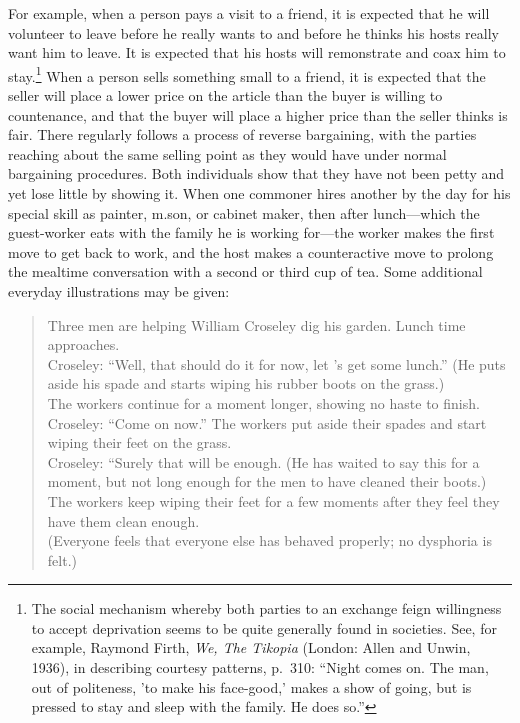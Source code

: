 \documentclass[openany,nobib]{tufte-book}
\begin{document}
\newpage For example, when a person pays a visit to a friend, it is expected that
he will volunteer to leave before he really wants to and before he
thinks his hosts really want him to leave. It is expected that his hosts
will remonstrate and coax him to stay.\footnote{The social mechanism
  whereby both parties to an exchange feign willingness to accept
  deprivation seems to be quite generally found in societies. See, for
  example, Raymond Firth, \emph{We, The Tikopia} (London: Allen and
  Unwin, 1936), in describing courtesy patterns, p.~310: ``Night comes
  on. The man, out of politeness, 'to make his face-good,' makes a show
  of going, but is pressed to stay and sleep with the family. He does
  so.''} When a person sells something small to a friend, it is expected
that the seller will place a lower price on the article than the buyer
is willing to countenance, and that the buyer will place a higher price
than the seller thinks is fair. There regularly follows a process of
reverse bargaining, with the parties reaching about the same selling
point as they would have under normal bargaining procedures. Both
individuals show that they have not been petty and yet lose little by
showing it. When one commoner hires another by the day for his special
skill as painter, m.son, or cabinet maker, then after lunch---which the
guest-worker eats with the family he is working for---the worker makes
the first move to get back to work, and the host makes a counteractive
move to prolong the mealtime conversation with a second or third cup of
tea. Some additional everyday illustrations may be given:

\begin{quote}
Three men are helping William Croseley dig his garden. Lunch time
approaches. \\
Croseley: ``Well, that should do it for now, let 's get some lunch.''
(He puts aside his spade and starts wiping his rubber boots on the
grass.) \\
The workers continue for a moment longer, showing no haste to finish.
Croseley: ``Come on now.'' The workers put aside their spades and start
wiping their feet on the grass.\\
Croseley: ``Surely that will be enough. (He has waited to say this for a
moment, but not long enough for the men to have cleaned their boots.) \\
The workers keep wiping their feet for a few moments after they feel
they have them clean enough.\\
(Everyone feels that everyone else has behaved properly; no dysphoria is
felt.)
\end{quote}
\end{document}
